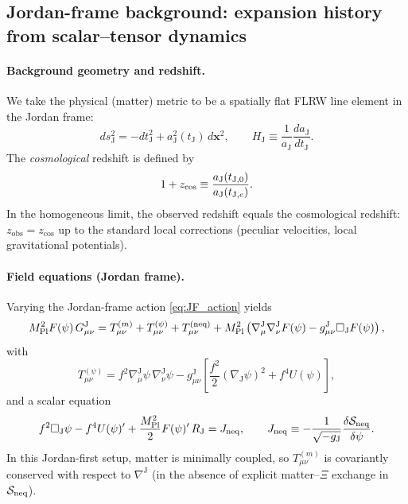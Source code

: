 \documentclass[10pt]{article}
\newcommand{\zobs}{z_{\mathrm{obs}}}
\newcommand{\zcos}{z_{\mathrm{cos}}}
\newcommand{\gJ}{g^{\mathrm{J}}}        %
\newcommand{\aJ}{a_{\mathrm{J}}}
\newcommand{\HJ}{H_{\mathrm{J}}}
\newcommand{\tJ}{t_{\mathrm{J}}}
\newcommand{\Mp}{M_{\mathrm{Pl}}}
\newcommand{\Fpsi}{F(\psi)}
\newcommand{\Upsi}{U(\psi)}
\begin{document}
\subsection{Jordan-frame background: expansion history from scalar--tensor dynamics}
\label{sec:jordan_background}

\paragraph{Background geometry and redshift.}
We take the physical (matter) metric to be a spatially flat FLRW line element in the Jordan frame:
\begin{equation}
ds_{\mathrm{J}}^{2} = -d\tJ^{2} + \aJ^{2}(\tJ)\,d\bm{x}^{2},
\qquad
\HJ \equiv \frac{1}{\aJ}\frac{d\aJ}{d\tJ}.
\end{equation}
The \emph{cosmological} redshift is defined by
\begin{equation}
1+\zcos \equiv \frac{\aJ(t_{{\rm J},0})}{\aJ(t_{{\rm J},e})}.
\label{eq:zcos_J_def}
\end{equation}
In the homogeneous limit, the observed redshift equals the cosmological redshift:
$\zobs=\zcos$ up to the standard local corrections (peculiar velocities, local gravitational potentials).

\paragraph{Field equations (Jordan frame).}
Varying the Jordan-frame action \eqref{eq:JF_action} yields
\begin{equation}
\Mp^{2}\Fpsi\,G^{\mathrm{J}}_{\mu\nu}
=
T^{(m)}_{\mu\nu}
+
T^{(\psi)}_{\mu\nu}
+
T^{(\rm neq)}_{\mu\nu}
+
\Mp^{2}\left(\nabla^{\mathrm{J}}_{\mu}\nabla^{\mathrm{J}}_{\nu}\Fpsi - \gJ_{\mu\nu}\Box_{\mathrm{J}}\Fpsi\right),
\label{eq:JF_einstein}
\end{equation}
with
\begin{equation}
T^{(\psi)}_{\mu\nu}
=
f^{2}\nabla^{\mathrm{J}}_{\mu}\psi\,\nabla^{\mathrm{J}}_{\nu}\psi
-
\gJ_{\mu\nu}\left[\frac{f^{2}}{2}(\nabla_{\mathrm{J}}\psi)^2+f^{4}\Upsi\right],
\label{eq:JF_Tpsi}
\end{equation}
and a scalar equation
\begin{equation}
f^{2}\Box_{\mathrm{J}}\psi - f^{4}\Upsi' + \frac{\Mp^{2}}{2}\Fpsi'\,R_{\mathrm{J}}
=
J_{\rm neq},
\qquad
J_{\rm neq}\equiv -\frac{1}{\sqrt{-g_{\mathrm{J}}}}\frac{\delta \mathcal{S}_{\rm neq}}{\delta\psi}.
\label{eq:JF_scalar}
\end{equation}
In this Jordan-first setup, matter is minimally coupled, so $T^{(m)}_{\mu\nu}$ is covariantly conserved
with respect to $\nabla^{\mathrm{J}}$ (in the absence of explicit matter--$\Xi$ exchange in $\mathcal{S}_{\rm neq}$).
\end{document}
